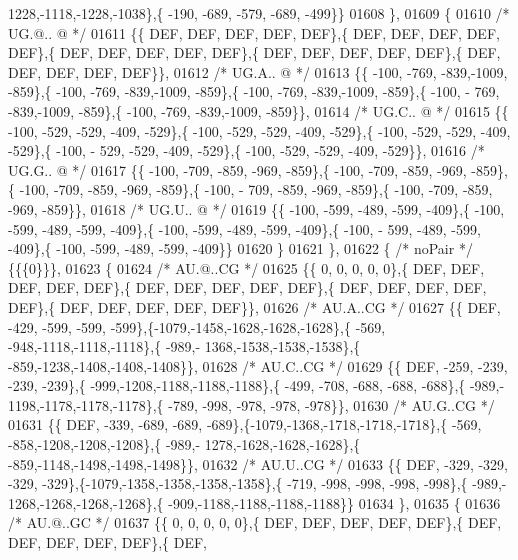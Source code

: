\begin{DoxyCode}
      1228,-1118,-1228,-1038\},\{ -190, -689, -579, -689, -499\}\}
01608 \},
01609 \{
01610 \textcolor{comment}{/* UG.@.. @ */}
01611 \{\{  DEF,  DEF,  DEF,  DEF,  DEF\},\{  DEF,  DEF,  DEF,  DEF,  DEF\},\{  DEF,  DEF,  DEF,  DEF,  DEF\},\{  DEF,  
      DEF,  DEF,  DEF,  DEF\},\{  DEF,  DEF,  DEF,  DEF,  DEF\}\},
01612 \textcolor{comment}{/* UG.A.. @ */}
01613 \{\{ -100, -769, -839,-1009, -859\},\{ -100, -769, -839,-1009, -859\},\{ -100, -769, -839,-1009, -859\},\{ -100, -
      769, -839,-1009, -859\},\{ -100, -769, -839,-1009, -859\}\},
01614 \textcolor{comment}{/* UG.C.. @ */}
01615 \{\{ -100, -529, -529, -409, -529\},\{ -100, -529, -529, -409, -529\},\{ -100, -529, -529, -409, -529\},\{ -100, -
      529, -529, -409, -529\},\{ -100, -529, -529, -409, -529\}\},
01616 \textcolor{comment}{/* UG.G.. @ */}
01617 \{\{ -100, -709, -859, -969, -859\},\{ -100, -709, -859, -969, -859\},\{ -100, -709, -859, -969, -859\},\{ -100, -
      709, -859, -969, -859\},\{ -100, -709, -859, -969, -859\}\},
01618 \textcolor{comment}{/* UG.U.. @ */}
01619 \{\{ -100, -599, -489, -599, -409\},\{ -100, -599, -489, -599, -409\},\{ -100, -599, -489, -599, -409\},\{ -100, -
      599, -489, -599, -409\},\{ -100, -599, -489, -599, -409\}\}
01620 \}
01621 \},
01622 \{ \textcolor{comment}{/* noPair */} \{\{\{0\}\}\},
01623 \{
01624 \textcolor{comment}{/* AU.@..CG */}
01625 \{\{    0,    0,    0,    0,    0\},\{  DEF,  DEF,  DEF,  DEF,  DEF\},\{  DEF,  DEF,  DEF,  DEF,  DEF\},\{  DEF,  
      DEF,  DEF,  DEF,  DEF\},\{  DEF,  DEF,  DEF,  DEF,  DEF\}\},
01626 \textcolor{comment}{/* AU.A..CG */}
01627 \{\{  DEF, -429, -599, -599, -599\},\{-1079,-1458,-1628,-1628,-1628\},\{ -569, -948,-1118,-1118,-1118\},\{ -989,-
      1368,-1538,-1538,-1538\},\{ -859,-1238,-1408,-1408,-1408\}\},
01628 \textcolor{comment}{/* AU.C..CG */}
01629 \{\{  DEF, -259, -239, -239, -239\},\{ -999,-1208,-1188,-1188,-1188\},\{ -499, -708, -688, -688, -688\},\{ -989,-
      1198,-1178,-1178,-1178\},\{ -789, -998, -978, -978, -978\}\},
01630 \textcolor{comment}{/* AU.G..CG */}
01631 \{\{  DEF, -339, -689, -689, -689\},\{-1079,-1368,-1718,-1718,-1718\},\{ -569, -858,-1208,-1208,-1208\},\{ -989,-
      1278,-1628,-1628,-1628\},\{ -859,-1148,-1498,-1498,-1498\}\},
01632 \textcolor{comment}{/* AU.U..CG */}
01633 \{\{  DEF, -329, -329, -329, -329\},\{-1079,-1358,-1358,-1358,-1358\},\{ -719, -998, -998, -998, -998\},\{ -989,-
      1268,-1268,-1268,-1268\},\{ -909,-1188,-1188,-1188,-1188\}\}
01634 \},
01635 \{
01636 \textcolor{comment}{/* AU.@..GC */}
01637 \{\{    0,    0,    0,    0,    0\},\{  DEF,  DEF,  DEF,  DEF,  DEF\},\{  DEF,  DEF,  DEF,  DEF,  DEF\},\{  DEF,  

\end{DoxyCode}
